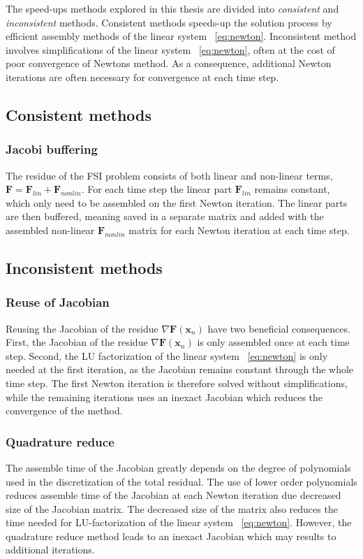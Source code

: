 The speed-ups methods explored in this thesis are divided into \textit{consistent} and \textit{inconsistent} methods. 
Consistent methods speeds-up the solution process by efficient assembly methods of the linear system ~\ref{eq:newton}. Inconsistent method involves simplifications of the linear system ~\ref{eq:newton}, often at the cost of poor convergence of Newtons method. As a consequence, additional Newton iterations are often necessary for convergence at each time step. 
\newpage
\subsection{Consistent methods}
\subsubsection{Jacobi buffering}
The residue of the FSI problem consists of both linear and non-linear terms, $\mathbf{F} = \mathbf{F}_{lin} + \mathbf{F}_{nonlin}$. For each time step the linear part $\mathbf{F}_{lin}$ remains constant, which only need to be assembled on the first Newton iteration.  The linear parts are then buffered, meaning saved in a separate matrix and added with the assembled non-linear $\mathbf{F}_{nonlin}$ matrix for each Newton iteration at each time step. 
\subsection{Inconsistent methods}    
\subsubsection{Reuse of Jacobian}
Reusing the Jacobian of the residue $\nabla \mathbf{F}(\mathbf{x}_n)$ have two beneficial consequences. First, the 
Jacobian of the residue $\nabla \mathbf{F}(\mathbf{x}_n)$ is only assembled once at each time step. Second, the
LU factorization of the linear system ~\ref{eq:newton} is only needed at the first iteration, as the Jacobian remains constant through the whole time step. The first Newton iteration is therefore solved without simplifications, while the remaining iterations uses an inexact Jacobian which reduces the convergence of the method.
\subsubsection{Quadrature reduce}
The assemble time of the Jacobian greatly depends on the degree of polynomials used in the discretization of the total residual.  The use of lower order polynomials reduces assemble time of the Jacobian at each Newton iteration due decreased size of the Jacobian matrix. The decreased size of the matrix also reduces the time needed for LU-factorization of the linear system ~\ref{eq:newton}. However, the quadrature reduce method leads to an inexact Jacobian which may results to additional iterations. 
